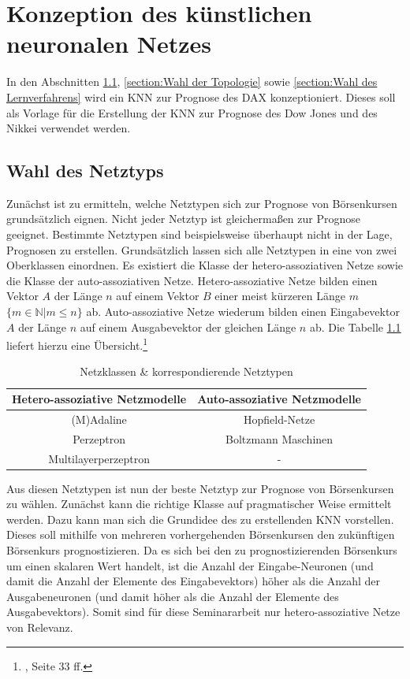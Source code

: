 \chapter{Konzeption des künstlichen neuronalen Netzes}
\label{chapter:Konzeption des künstlichen neuronalen Netzes}

In den Abschnitten \ref{section:Wahl des Netztyps}, \ref{section:Wahl der Topologie} sowie \ref{section:Wahl des Lernverfahrens} wird ein KNN zur Prognose des DAX konzeptioniert. Dieses soll als Vorlage für die Erstellung der KNN zur Prognose des Dow Jones und des Nikkei verwendet werden.

\section{Wahl des Netztyps}
\label{section:Wahl des Netztyps}

Zunächst ist zu ermitteln, welche Netztypen sich zur Prognose von Börsenkursen grundsätzlich eignen. Nicht jeder Netztyp ist gleichermaßen zur Prognose geeignet. Bestimmte Netztypen sind beispielsweise überhaupt nicht in der Lage, Prognosen zu erstellen. Grundsätzlich lassen sich alle Netztypen in eine von zwei Oberklassen einordnen. Es existiert die Klasse der hetero-assoziativen Netze sowie die Klasse der auto-assoziativen Netze. Hetero-assoziative Netze bilden einen Vektor $A$ der Länge $n$ auf einem Vektor $B$ einer meist kürzeren Länge $m$ $\{m \in \mathbb{N} | m \le n\}$ ab. Auto-assoziative Netze wiederum bilden einen Eingabevektor $A$ der Länge $n$ auf einem Ausgabevektor der gleichen Länge $n$ ab. Die Tabelle \ref{tab:Netztypen} liefert hierzu eine Übersicht.\footnote{\Vgl{}, Seite 33 ff.}

\begin{table}[H]
\centering
\begin{tabular}{|c|c|}
\hline 
\textbf{Hetero-assoziative Netzmodelle} & \textbf{Auto-assoziative Netzmodelle} \\ 
\hline 
(M)Adaline & Hopfield-Netze \\ 
\hline  
Perzeptron &  Boltzmann Maschinen \\ 
\hline 
Multilayerperzeptron & - \\ 
\hline 
\end{tabular} 
\label{tab:Netztypen}
\caption{Netzklassen \& korrespondierende Netztypen}
\end{table}

Aus diesen Netztypen ist nun der beste Netztyp zur Prognose von Börsenkursen zu wählen. Zunächst kann die richtige Klasse auf pragmatischer Weise ermittelt werden. Dazu kann man sich die Grundidee des zu erstellenden KNN vorstellen. Dieses soll mithilfe von mehreren vorhergehenden Börsenkursen den zukünftigen Börsenkurs prognostizieren. Da es sich bei den zu prognostizierenden Börsenkurs um einen skalaren Wert handelt, ist die Anzahl der Eingabe-Neuronen (und damit die Anzahl der Elemente des Eingabevektors) höher als die Anzahl der Ausgabeneuronen (und damit höher als die Anzahl der Elemente des Ausgabevektors). Somit sind für diese Seminararbeit nur hetero-assoziative Netze von Relevanz.


